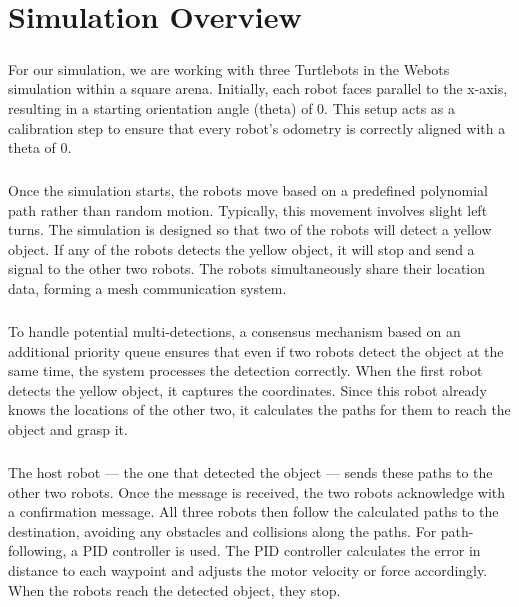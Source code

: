 \chapter{Simulation Overview}

\paragraph*{}
For our simulation, we are working with three Turtlebots in the Webots simulation within a square arena. Initially, each robot faces parallel to the x-axis, resulting in a starting orientation angle (theta) of 0. This setup acts as a calibration step to ensure that every robot's odometry is correctly aligned with a theta of 0.

\paragraph*{}
Once the simulation starts, the robots move based on a predefined polynomial path rather than random motion. Typically, this movement involves slight left turns. The simulation is designed so that two of the robots will detect a yellow object. If any of the robots detects the yellow object, it will stop and send a signal to the other two robots. The robots simultaneously share their location data, forming a mesh communication system.

\paragraph*{}
To handle potential multi-detections, a consensus mechanism based on an additional priority queue ensures that even if two robots detect the object at the same time, the system processes the detection correctly. When the first robot detects the yellow object, it captures the coordinates. Since this robot already knows the locations of the other two, it calculates the paths for them to reach the object and grasp it.

\paragraph*{}
The host robot — the one that detected the object — sends these paths to the other two robots. Once the message is received, the two robots acknowledge with a confirmation message. All three robots then follow the calculated paths to the destination, avoiding any obstacles and collisions along the paths. For path-following, a PID controller is used. The PID controller calculates the error in distance to each waypoint and adjusts the motor velocity or force accordingly. When the robots reach the detected object, they stop.

